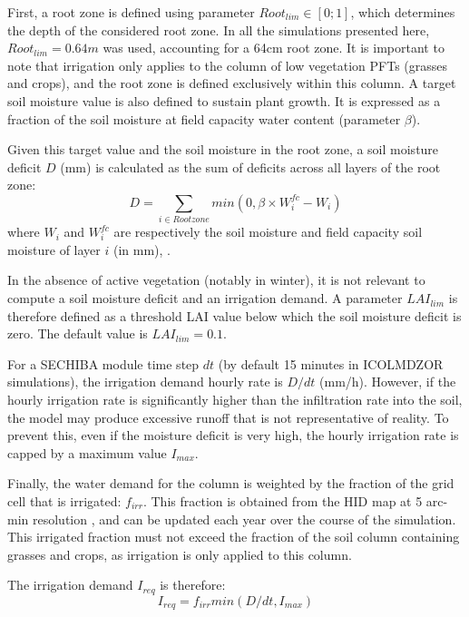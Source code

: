 First, a root zone is defined using parameter $Root_{lim} \in [0;1]$, which determines the depth of the considered root zone. In all the simulations presented here, $Root_{lim} = 0.64m$ was used, accounting for a 64cm root zone. It is important to note that irrigation only applies to the column of low vegetation PFTs (grasses and crops), and the root zone is defined exclusively within this column.%
A target soil moisture value is also defined to sustain plant growth. It is expressed as a fraction of the soil moisture at field capacity water content (parameter $\beta$).

Given this target value and the soil moisture in the root zone, a soil moisture deficit $D$ (mm) is calculated as the sum of deficits across all layers of the root zone:
\begin{equation}
    D = \sum_{i \in Rootzone} min(0,\beta \times W_i^{fc} - W_i)
\end{equation}
where $W_i$ and $W_i^{fc}$ are respectively the soil moisture and field capacity soil moisture of layer $i$ (in mm), .

In the absence of active vegetation (notably in winter), it is not relevant to compute a soil moisture deficit and an irrigation demand. A parameter $LAI_{lim}$ is therefore defined as a threshold LAI value below which the soil moisture deficit is zero. The default value is $LAI_{lim}=0.1$.

For a SECHIBA module time step $dt$ (by default 15 minutes in ICOLMDZOR simulations), the irrigation demand hourly rate is $D/dt$ (mm/h). However, if the hourly irrigation rate is significantly higher than the infiltration rate into the soil, the model may produce excessive runoff that is not representative of reality. To prevent this, even if the moisture deficit is very high, the hourly irrigation rate is capped by a maximum value $I_{max}$.

Finally, the water demand for the column is weighted by the fraction of the grid cell that is irrigated: $f_{irr}$. This fraction is obtained from the HID map at 5 arc-min resolution \citep{siebert_quantifying_2010}, and can be updated each year over the course of the simulation.
This irrigated fraction must not exceed the fraction of the soil column containing grasses and crops, as irrigation is only applied to this column.

The irrigation demand $I_{req}$ is therefore:
\begin{equation}
    I_{req} = f_{irr} min(D/dt, I_{max})
\end{equation}

